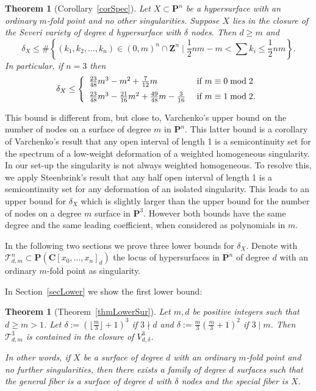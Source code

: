 \documentclass{amsart}
\newcommand{\Ps}{\mathbf{P}}
\newcommand{\C}{\mathbf{C}}
\newcommand{\Z}{\mathbf{Z}}
\newtheorem{theorem}[lemma]{Theorem}
\theoremstyle{definition}
\theoremstyle{remark}
\begin{document}
\begin{theorem}[Corollary~\ref{corSpec}]
Let $X\subset \Ps^n$ be a hypersurface with an ordinary $m$-fold point and no other singularities. Suppose $X$ lies in the closure of the Severi variety of degree $d$ hypersurface with $\delta$ nodes. Then $d\geq m$ and 
\[ \delta_X \leq  \# \left\{ (k_1,k_2,\dots,k_n) \in (0,m)^n \cap \Z^n \mid \frac{1}{2}nm-m<\sum k_i \leq \frac{1}{2}nm \right\}. \]
In particular, if $n=3$ then 
\[ \delta_X\leq \left\{
\begin{array}{ll}
\frac{23}{48}m^3-m^2+\frac{7}{12} m &\mbox{ if } m\equiv 0\bmod 2\vspace{0.2cm}\\ 
\frac{23}{48}m^3-\frac{21}{16}m^2+\frac{49}{48}m-\frac{3}{16} &\mbox{ if } m\equiv 1 \bmod 2.\end{array}\right.\]
\end{theorem}

This bound is different from, but close to, Varchenko's upper bound on the number of nodes on a surface of degree $m$ in $\Ps^n$. This latter bound is a corollary of   Varchenko's  result  that  any open interval of length 1 is a semicontinuity set for the spectrum of  a low-weight deformation of a weighted homogeneous singularity. In our set-up the singularity is not always weighted homogeneous. To resolve this, we apply  Steenbrink's result that any half open interval of length 1 is a semicontinuity set for any deformation of an isolated singularity. This leads to an upper bound for $\delta_X$ which is slightly larger than the upper bound for the number of nodes on a degree $m$ surface in $\Ps^3$. However  both bounds have the same degree and the same leading coefficient, when considered as polynomials in $m$.

In the following two sections we prove three lower bounds for $\delta_X$. Denote with $\mathcal{T}_{d,m}^n \subset  \Ps(\C[x_0,\dots,x_n]_d)$ the locus of hypersurfaces in $\Ps^n$ of degree $d$ with an ordinary $m$-fold point as singularity.

In Section~\ref{secLower} we show the first lower bound:
\begin{theorem}[Theorem~\ref{thmLowerSur}]  Let $m,d$ be positive integers such that $ d\geq m>1$.
Let $\delta:=(\lfloor \frac{ m}{3}\rfloor+1)^{3}$ if $3\nmid d$ and  $\delta:=\frac{m}{3}( \frac{m}{3}+1)^2$  if $3\mid m$. 
 Then $\mathcal{T}^3_{d,m}$ is contained in the closure of $V^3_{d,\delta}$. 
 
 In other words, if $X$ be a surface of degree $d$ with an ordinary $m$-fold point and no further singularities, then there exists a family of degree $d$ surfaces such that the general fiber is a surface of degree $d$ with $\delta$ nodes and the special fiber is  $X$.
\end{theorem}
\end{document}
